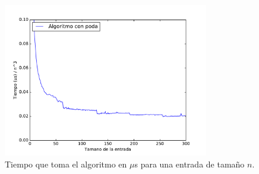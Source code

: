 \begin{figure}[H]
 \centering
	\includegraphics[width=0.8\textwidth]{img/tiempos/kamehameha4.pdf}
	\caption{\footnotesize Tiempo que toma el algoritmo en $\mu$s para una entrada de tamaño $n$.}
	\label{fig:kamehameha-tiempos4}
\end{figure}



